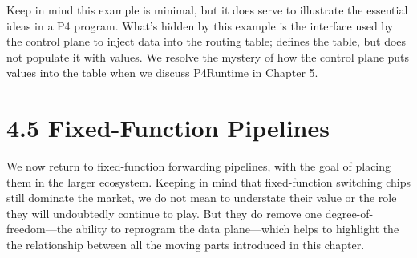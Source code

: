 \documentclass[letterpaper,11pt,english]{sphinxmanual}
\begin{document}
\begin{sphinxVerbatim}[commandchars=\\\{\}]

 
\end{sphinxVerbatim}

Keep in mind this example is minimal, but it does serve to illustrate
the essential ideas in a P4 program. What’s hidden by this example is
the interface used by the control plane to inject data into the
routing table;  defines the table, but does not
populate it with values. We resolve the mystery of how the control
plane puts values into the table when we discuss P4Runtime in
Chapter 5.


\section{4.5  Fixed-Function Pipelines}
\label{\detokenize{switch:fixed-function-pipelines}}
We now return to fixed-function forwarding pipelines, with the goal of
placing them in the larger ecosystem. Keeping in mind that
fixed-function switching chips still dominate the market, we do not
mean to understate their value or the role they will undoubtedly
continue to play. But they do remove one degree-of-freedom—the ability
to reprogram the data plane—which helps to highlight the the
relationship between all the moving parts introduced in this chapter.
\end{document}
